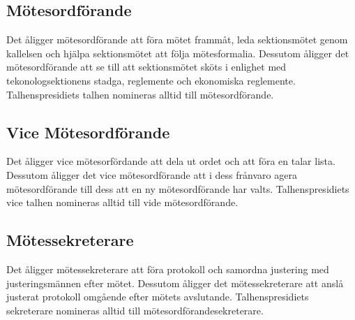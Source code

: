 \subsection{Mötesordförande}
Det åligger mötesordförande att föra mötet frammåt, leda sektionsmötet genom kallelsen och hjälpa sektionsmötet att följa mötesformalia.
Dessutom åligger det mötesordförande att se till att sektionsmötet sköts i enlighet med tekonologsektionens stadga, reglemente och ekonomiska reglemente.
Talhenspresidiets talhen nomineras alltid till mötesordförande.
\subsection{Vice Mötesordförande}
Det åligger vice mötesorfördande att dela ut ordet och att föra en talar lista.
Dessutom åligger det vice mötesordförande att i dess frånvaro agera mötesordförande till dess att en ny mötesordförande har valts.
Talhenspresidiets vice talhen nomineras alltid till vide mötesordförande.
\subsection{Mötessekreterare}
Det åligger mötessekreterare att föra protokoll och samordna justering med justeringsmännen efter mötet. 
Dessutom åligger det mötessekreterare att anslå justerat protokoll omgående efter mötets avslutande.
Talhenspresidiets sekreterare nomineras alltid till mötesordförandesekreterare.

\newpage

